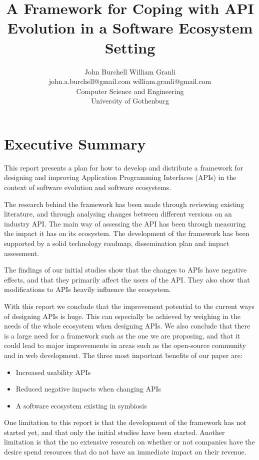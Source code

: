 \documentclass{article}
\title{A Framework for Coping with API Evolution in a Software Ecosystem Setting}
\begin{document}
\author{John Burchell \qquad William Granli \\
		john.a.burchell@gmail.com \qquad william.granli@gmail.com \\
		Computer Science and Engineering  \\
		University of Gothenburg }

\maketitle
\section{Executive Summary}
This report presents a plan for how to develop and distribute a framework for designing and improving Application Programming Interfaces (APIs) in the context of software evolution and software ecosystems. \smallskip

The research behind the framework has been made through reviewing existing literature, and through analysing changes between  different versions on an industry API. The main way of assessing the API has been through measuring the impact it has on its ecosystem. The development of the framework has been supported by a solid technology roadmap, dissemination plan and impact assessment. \smallskip

The findings of our initial studies show that the changes to APIs have negative effects, and that they primarily affect the users of the API. They also show that modifications to APIs heavily influence the ecosystem. \smallskip

With this report we conclude that the improvement potential to the current ways of designing APIs is huge. This can especially be achieved by weighing in the needs of the whole ecosystem when designing APIs. We also conclude that there is a large need for a framework such as the one we are proposing, and that it could lead to major improvements in areas such as the open-source community and in web development. The three most important benefits of our paper are: 

\begin{itemize}
\item Increased usability APIs
\item Reduced negative impacts when changing APIs
\item A software ecosystem existing in symbiosis
\end{itemize}

One limitation to this report is that the development of the framework has not started yet, and that only the initial studies have been started. Another limitation is that the no extensive research on whether or not companies have the desire spend resources that do not have an immediate impact on their revenue. 
\end{document}

